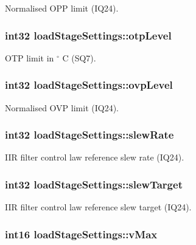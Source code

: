 Normalised O\-P\-P limit (I\-Q24). \hypertarget{a00008_aa6747ff53a28e2d70f455cbd63ff640a}{
\subsubsection[{otp\-Level}]{\setlength{\rightskip}{0pt plus 5cm}int32 load\-Stage\-Settings\-::otp\-Level}}\label{a00008_aa6747ff53a28e2d70f455cbd63ff640a}
O\-T\-P limit in $ ^\circ$ C (S\-Q7). \hypertarget{a00008_a0f9add3cfd5cacd7ee9473c224b49968}{
\subsubsection[{ovp\-Level}]{\setlength{\rightskip}{0pt plus 5cm}int32 load\-Stage\-Settings\-::ovp\-Level}}\label{a00008_a0f9add3cfd5cacd7ee9473c224b49968}
Normalised O\-V\-P limit (I\-Q24). \hypertarget{a00008_a8dae50a66a5a7802c4176406bf67eb26}{
\subsubsection[{slew\-Rate}]{\setlength{\rightskip}{0pt plus 5cm}int32 load\-Stage\-Settings\-::slew\-Rate}}\label{a00008_a8dae50a66a5a7802c4176406bf67eb26}
I\-I\-R filter control law reference slew rate (I\-Q24). \hypertarget{a00008_acc0f896ac1d2a998d480739a13461b19}{
\subsubsection[{slew\-Target}]{\setlength{\rightskip}{0pt plus 5cm}int32 load\-Stage\-Settings\-::slew\-Target}}\label{a00008_acc0f896ac1d2a998d480739a13461b19}
I\-I\-R filter control law reference slew target (I\-Q24). \hypertarget{a00008_a13979ea63b60199c61b1872c03b0a51d}{
\subsubsection[{v\-Max}]{\setlength{\rightskip}{0pt plus 5cm}int16 load\-Stage\-Settings\-::v\-Max}}\label{a00008_a13979ea63b60199c61b1872c03b0a51d}

